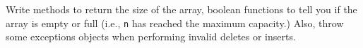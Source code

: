 Write methods to return the size of the array, boolean functions
to tell you if the array is empty or full (i.e., \verb!n! has
reached the maximum capacity.)
Also, throw some exceptions objects when performing invalid deletes
or inserts.
